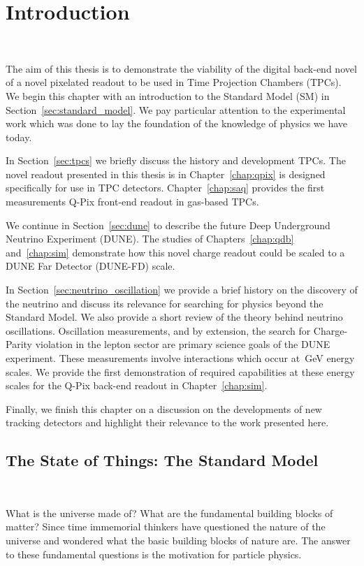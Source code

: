 \chapter{Introduction}~\label{chap:intro}

The aim of this thesis is to demonstrate the viability of the digital back-end novel of a novel pixelated readout to be used in Time Projection Chambers (TPCs). 
We begin this chapter with an introduction to the Standard Model (SM) in Section~\ref{sec:standard_model}.
We pay particular attention to the experimental work which was done to lay the foundation of the knowledge of physics we have today.

In Section~\ref{sec:tpcs} we briefly discuss the history and development TPCs. 
The novel readout presented in this thesis is in Chapter~\ref{chap:qpix} is designed specifically for use in TPC detectors.
Chapter~\ref{chap:saq} provides the first measurements Q-Pix front-end readout in gas-based TPCs.

We continue in Section~\ref{sec:dune} to describe the future Deep Underground Neutrino Experiment (DUNE).
The studies of Chapters~\ref{chap:qdb} and~\ref{chap:sim} demonstrate how this novel charge readout could be scaled to a DUNE Far Detector (DUNE-FD) scale.

In Section~\ref{sec:neutrino_oscillation} we provide a brief history on the discovery of the neutrino and discuss its relevance for searching for physics beyond the Standard Model.
We also provide a short review of the theory behind neutrino oscillations.
Oscillation measurements, and by extension, the search for Charge-Parity violation in the lepton sector are primary science goals of the DUNE experiment.
These measurements involve interactions which occur at~\unit{GeV} energy scales.
We provide the first demonstration of required capabilities at these energy scales for the Q-Pix back-end readout in Chapter~\ref{chap:sim}.

Finally, we finish this chapter on a discussion on the developments of new tracking detectors and highlight their relevance to the work presented here.

\section{The State of Things: The Standard Model}~\label{sec:standard_model}

What is the universe made of?
What are the fundamental building blocks of matter?
Since time immemorial thinkers have questioned the nature of the universe and wondered what the basic building blocks of nature are.
The answer to these fundamental questions is the motivation for particle physics.


